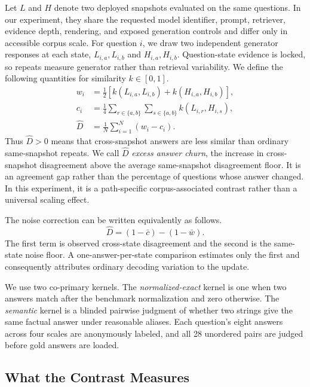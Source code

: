 \documentclass[sigconf,nonacm]{acmart}
\newcommand{\Dhat}{\widehat{D}}
\begin{document}
Let $L$ and $H$ denote two deployed snapshots evaluated on the same questions. In our experiment, they share the requested model identifier, prompt, retriever, evidence depth, rendering, and exposed generation controls and differ only in accessible corpus scale. For question $i$, we draw two independent generator responses at each state, $L_{i,a},L_{i,b}$ and $H_{i,a},H_{i,b}$. Question-state evidence is locked, so repeats measure generator rather than retrieval variability. We define the following quantities for similarity $k\in[0,1]$.
\begin{align}
 w_i &= \tfrac{1}{2}\left[k(L_{i,a},L_{i,b}) +
                         k(H_{i,a},H_{i,b})\right],\\
 c_i &= \tfrac{1}{4}\sum_{r\in\{a,b\}}\sum_{s\in\{a,b\}}
                         k(L_{i,r},H_{i,s}),\\
 \Dhat &= \tfrac{1}{N}\sum_{i=1}^{N}(w_i-c_i).
 \label{eq:d}
\end{align}
Thus $\Dhat>0$ means that cross-snapshot answers are less similar than ordinary same-snapshot repeats. We call $\Dhat$ \emph{excess answer churn}, the increase in cross-snapshot disagreement above the average same-snapshot disagreement floor. It is an agreement gap rather than the percentage of questions whose answer changed. In this experiment, it is a path-specific corpus-associated contrast rather than a universal scaling effect.

The noise correction can be written equivalently as follows.
\begin{equation}
 \Dhat=(1-\bar c)-(1-\bar w).
 \label{eq:excess-disagreement}
\end{equation}
The first term is observed cross-state disagreement and the second is the same-state noise floor.  A one-answer-per-state comparison estimates only the first and consequently attributes ordinary decoding variation to the update.

We use two co-primary kernels.  The \emph{normalized-exact} kernel is one when two answers match after the benchmark normalization and zero otherwise.  The \emph{semantic} kernel is a blinded pairwise judgment of whether two strings give the same factual answer under reasonable aliases.  Each question's eight answers across four scales are anonymously labeled, and all 28 unordered pairs are judged before gold answers are loaded.

\subsection{What the Contrast Measures}
\end{document}
